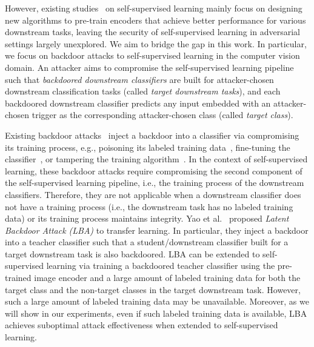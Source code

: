  However, existing studies~\cite{hadsell2006dimensionality,he2020momentum,chen2020simple,hjelm2018learning,grill2020bootstrap} on self-supervised learning mainly focus on designing new algorithms to pre-train encoders that achieve better performance for various downstream tasks, leaving the security of self-supervised learning in adversarial settings largely unexplored. 
We aim to bridge the gap in this work. %
In particular, we focus on backdoor attacks to self-supervised learning in the computer vision domain. An attacker aims to compromise the self-supervised learning pipeline such that \emph{backdoored downstream classifiers} are built for  attacker-chosen downstream classification tasks (called \emph{target downstream tasks}), and each backdoored downstream classifier predicts any input embedded with an attacker-chosen trigger as the corresponding attacker-chosen class (called \emph{target class}).

Existing backdoor attacks~\cite{gu2017badnets,chen2017targeted,liutrojaning2018,bagdasaryan2020blind} inject a backdoor into a classifier via compromising its training process, e.g., poisoning its labeled training data~\cite{gu2017badnets,chen2017targeted}, fine-tuning the classifier~\cite{liutrojaning2018}, or tampering the training algorithm~\cite{bagdasaryan2020blind}.  
In the context of self-supervised learning, these backdoor attacks require compromising the second component of the self-supervised learning pipeline, i.e., the training process of the downstream classifiers. Therefore, they are not applicable when a downstream classifier does not have a training process (i.e., the downstream task has no labeled training data) or its training process maintains integrity. %
Yao et al.~\cite{yao2019latent} proposed \emph{Latent Backdoor Attack (LBA)} to transfer learning. In particular, they inject a backdoor into a teacher classifier such that a student/downstream classifier built for a target downstream task is also backdoored. LBA can be extended to self-supervised learning via training a backdoored teacher classifier using the pre-trained image encoder and a large amount of labeled training data for both the target class and the non-target classes in the target downstream task. However, such a large amount of labeled training data may be unavailable. %
Moreover, as we will show in our experiments, even if such labeled training data is available, LBA achieves suboptimal attack effectiveness when extended to self-supervised learning. 










